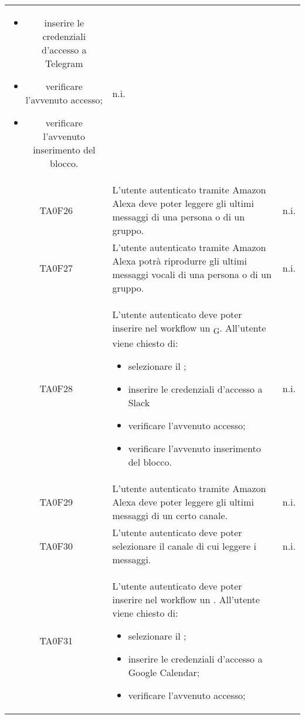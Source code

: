 \begin{center}
\begin{longtable}{ c m{12cm} c }
\begin{itemize}
		\item inserire le credenziali d'accesso a Telegram										
		\item verificare l'avvenuto accesso;										
		\item verificare l'avvenuto inserimento del blocco.										
	\end{itemize} 																																								& n.i. \\       
	TA0F26   & L'utente autenticato tramite Amazon Alexa deve poter leggere gli ultimi messaggi di una persona o di un gruppo.                     										& n.i. \\
	TA0F27   & L'utente autenticato tramite Amazon Alexa potrà riprodurre gli ultimi messaggi vocali di una persona o di un gruppo.                										& n.i. \\
	TA0F28   & L'utente autenticato deve poter inserire nel workflow un \BSlack\textsubscript{G}. All'utente viene chiesto di: \begin{itemize}										
		\item selezionare il \BSlack;										
		\item inserire le credenziali d'accesso a Slack										
		\item verificare l'avvenuto accesso;										
		\item verificare l'avvenuto inserimento del blocco.										
	\end{itemize} & n.i. \\    	                                          										
	TA0F29   & L'utente autenticato tramite Amazon Alexa deve poter leggere gli ultimi messaggi di un certo canale.                             										& n.i. \\
	TA0F30   & L'utente autenticato deve poter selezionare il canale di cui leggere i messaggi.                                          										& n.i. \\
	TA0F31   & L'utente autenticato deve poter inserire nel workflow un \BCalendario. All'utente viene chiesto di: \begin{itemize}										
		\item selezionare il \BCalendario;										
		\item inserire le credenziali d'accesso a Google Calendar;										
		\item verificare l'avvenuto accesso;										

\end{itemize}
\end{longtable}
\end{center}
